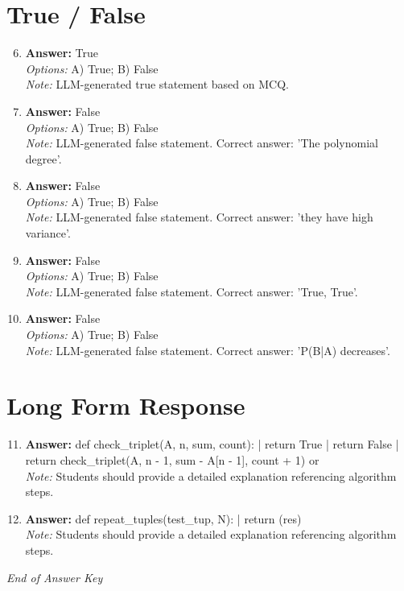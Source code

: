 \documentclass[12pt]{article}
\begin{document}
\section*{True / False}
\begin{enumerate}[label=\arabic*.]
\setcounter{enumi}{5}
\item \textbf{Answer:} True
\\ \textit{Options:} A) True; B) False
\\ \textit{Note:} LLM-generated true statement based on MCQ.
\item \textbf{Answer:} False
\\ \textit{Options:} A) True; B) False
\\ \textit{Note:} LLM-generated false statement. Correct answer: 'The polynomial degree'.
\item \textbf{Answer:} False
\\ \textit{Options:} A) True; B) False
\\ \textit{Note:} LLM-generated false statement. Correct answer: 'they have high variance'.
\item \textbf{Answer:} False
\\ \textit{Options:} A) True; B) False
\\ \textit{Note:} LLM-generated false statement. Correct answer: 'True, True'.
\item \textbf{Answer:} False
\\ \textit{Options:} A) True; B) False
\\ \textit{Note:} LLM-generated false statement. Correct answer: 'P(B|A) decreases'.
\end{enumerate}

\section*{Long Form Response}
\begin{enumerate}[label=\arabic*.]
\setcounter{enumi}{10}
\item \textbf{Answer:} def check\_triplet(A, n, sum, count): | return True | return False | return check\_triplet(A, n - 1, sum - A[n - 1], count + 1) or\
\\ \textit{Note:} Students should provide a detailed explanation referencing algorithm steps.
\item \textbf{Answer:} def repeat\_tuples(test\_tup, N): | return (res)
\\ \textit{Note:} Students should provide a detailed explanation referencing algorithm steps.
\end{enumerate}

\vfill
\noindent\textit{End of Answer Key}
\end{document}
